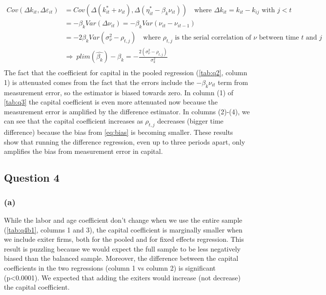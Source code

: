 \documentclass[11pt]{article}
\begin{document}
\begin{align}\label{eq:bias}
 Cov(\Delta k_{it},\Delta \varepsilon_{it})& =
Cov\left(\Delta (k_{it}^*+\nu_{it} ),\Delta (\eta_{it}^*-\beta_k\nu_{it})\right) \quad \text{where $\Delta k_{it}=k_{it}-k_{ij}$ with $j<t$}\\ \nonumber
&=-\beta_k Var(\Delta \nu_{it})=-\beta_k Var(\nu_{it}-\nu_{it-1})\\ \nonumber
 &=-2\beta_k Var(\sigma^2_{\nu}-\rho_{t,j}) \quad \text{where $\rho_{t,j}$ is the serial correlation of $\nu$ between time $t$ and $j$}\\ \nonumber
 & 	\Rightarrow \ 
 plim(\hat{\beta_k})-\beta_k= -\frac{2(\sigma^2_{\nu}-\rho_{t,j})}{\sigma_{k}^2 } \\ \nonumber
\end{align}
The fact that the coefficient for capital in the pooled regression (\autoref{tab:q2}, column 1) is attenuated comes from the fact that the errors include the $-\beta_k\nu_{it}$ term from measurement error, so the estimator is biased towards zero. In column (1) of \autoref{tab:q3} the capital coefficient is even more attenuated now because the measurement error is amplified by the difference estimator. In columns (2)-(4), we can see that the capital coefficient increases as $\rho_{t,j}$ decreases (bigger time difference) because the bias from \autoref{eq:bias} is becoming smaller. These results show that running the difference regression, even up to three periods apart, only amplifies the bias from measurement error in capital. 

\newpage

\subsection*{Question 4} \label{q4}
\subsubsection*{(a)}

While the labor and age coefficient don't change when we use the entire sample (\autoref{tab:q4b1}, columns 1 and 3), the capital coefficient is marginally smaller when we include exiter firms, both for the pooled and for fixed effects regression. This result is puzzling because we would expect the full sample to be less negatively biased than the balanced sample. Moreover, the difference between the capital coefficients in the two regressions (column 1 vs column 2) is significant (p<0.0001). We expected that adding the exiters would increase (not decrease) the capital coefficient. 
\end{document}

